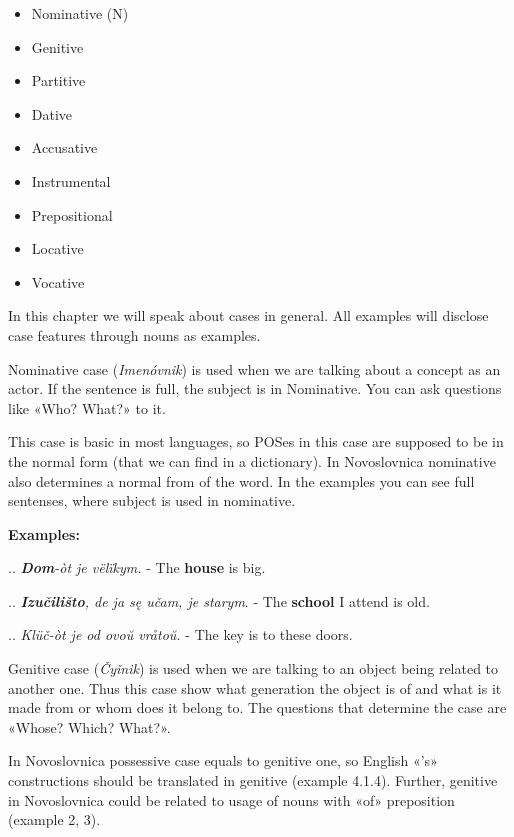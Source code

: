 \begin{itemize}
	\item Nominative (N)
	\item Genitive
	\item Partitive
	\item Dative
	\item Accusative
	\item Instrumental
	\item Prepositional
	\item Locative
	\item Vocative
\end{itemize}

In this chapter we will speak about cases in general. All examples will disclose case features through nouns as examples.

Nominative case (\textit{Imenóvnik}) is used when we are talking about a concept as an actor. If the sentence is full, the subject is in Nominative. You can ask questions like «Who? What?» to it.

This case is basic in most languages, so POSes in this case are supposed to be in the normal form (that we can find in a dictionary). In Novoslovnica nominative also determines a normal from of the word. In the examples you can see full sentenses, where subject is used in nominative.

\textbf{Examples:}

.. \textit{\textbf{Dom}-òt je vëlïkym.} - The \textbf{house} is big.

.. \textit{\textbf{Izučilišto}, de ja sę učam, je starym}. - The \textbf{school} I attend is old.

.. \textit{Klüč-òt je od ovoŭ vråtoŭ.} - The key is to these doors.

Genitive case (\textit{Čyǐnik}) is used when we are talking to an object being related to another one. Thus this case show what generation the object is of and what is it made from or whom does it belong to. The questions that determine the case are «Whose? Which? What?».

In Novoslovnica possessive case equals to genitive one, so English «'s» constructions should be translated in genitive (example 4.1.4). Further, genitive in Novoslovnica could be related to usage of nouns with «of» preposition (example 2, 3).

